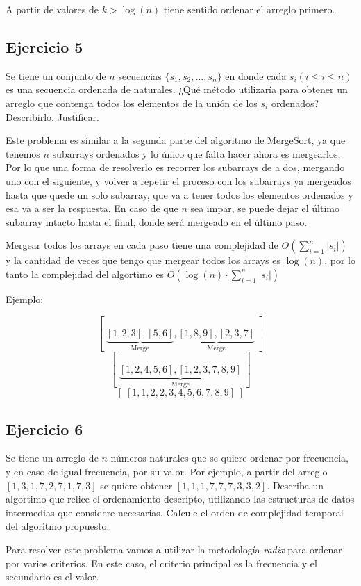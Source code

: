 A partir de valores de $k > \log(n)$ tiene sentido ordenar el arreglo primero.

\subsection{Ejercicio 5}
Se tiene un conjunto de $n$ secuencias $\{s_1, s_2, \ldots, s_n\}$ en donde cada $s_i (i \leq i \leq n)$ es una secuencia ordenada de naturales. ¿Qué método utilizaría para obtener un arreglo que contenga todos los elementos de la unión de los $s_i$ ordenados? Describirlo. Justificar.

Este problema es similar a la segunda parte del algoritmo de MergeSort, ya que tenemos $n$ subarrays ordenados y lo único que falta hacer ahora es mergearlos. Por lo que una forma de resolverlo es recorrer los subarrays de a dos, mergando uno con el siguiente, y volver a repetir el proceso con los subarrays ya mergeados hasta que quede un solo subarray, que va a tener todos los elementos ordenados y esa va a ser la respuesta. En caso de que $n$ sea impar, se puede dejar el último subarray intacto hasta el final, donde será mergeado en el último paso.

Mergear todos los arrays en cada paso tiene una complejidad de $O(\sum_{i=1}^{n} |s_i|)$ y la cantidad de veces que tengo que mergear todos los arrays es $\log(n)$, por lo tanto la complejidad del algortimo es $O(\log(n) \cdot \sum_{i=1}^{n} |s_i|)$

Ejemplo:

{
\large
\[[\;\underbrace{[1,2,3], [5,6]}_\text{Merge}, \underbrace{[1,8,9], [2,3,7]}_\text{Merge}\;]\]
\[[\;\underbrace{[1,2,4,5,6], [1,2,3,7,8,9]}_\text{Merge}\;]\]
\[[\;[1,1,2,2,3,4,5,6,7,8,9]\;]\]
}

\subsection{Ejercicio 6}
Se tiene un arreglo de $n$ números naturales que se quiere ordenar por frecuencia, y en caso de igual frecuencia, por su valor. Por ejemplo, a partir del arreglo $[1,3,1,7,2,7,1,7,3]$ se quiere obtener $[1,1,1,7,7,7,3,3,2]$. Describa un algortimo que relice el ordenamiento descripto, utilizando las estructuras de datos intermedias que considere necesarias. Calcule el orden de complejidad temporal del algoritmo propuesto.

Para resolver este problema vamos a utilizar la metodología \textit{radix} para ordenar por varios criterios. En este caso, el criterio principal es la frecuencia y el secundario es el valor.

